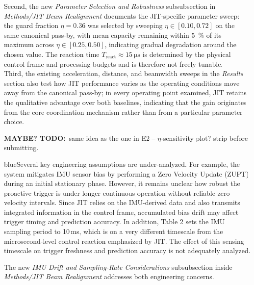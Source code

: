 \documentclass{article}
\newcommand{\blue}[1]{\begin{color}{blue}#1\end{color}}
\newcommand{\todo}[1]{\textcolor{todopurple}{\textbf{MAYBE? TODO:}~#1}}
\begin{document}
\noindent Second, the new \emph{Parameter Selection and Robustness} subsubsection in \emph{Methods/JIT Beam Realignment} documents the JIT-specific parameter sweep: the guard fraction $\eta = 0.36$ was selected by sweeping $\eta \in [0.10, 0.72]$ on the same canonical pass-by, with mean capacity remaining within \SI{5}{\percent} of its maximum across $\eta \in [0.25, 0.50]$, indicating gradual degradation around the chosen value. The reaction time $T_{\text{react}} \approx \SI{15}{\micro\second}$ is determined by the physical control-frame and processing budgets and is therefore not freely tunable.\\

\noindent Third, the existing acceleration, distance, and beamwidth sweeps in the \emph{Results} section also test how JIT performance varies as the operating conditions move away from the canonical pass-by; in every operating point examined, JIT retains the qualitative advantage over both baselines, indicating that the gain originates from the core coordination mechanism rather than from a particular parameter choice.

\todo{same idea as the one in E2 -- $\eta$-sensitivity plot? strip before submitting.}

\begin{tcbremark}
{\selectfont
\blue{Several key engineering assumptions are under-analyzed. For example, the system mitigates IMU sensor bias by performing a Zero Velocity Update (ZUPT) during an initial stationary phase. However, it remains unclear how robust the proactive trigger is under longer continuous operation without reliable zero-velocity intervals. Since JIT relies on the IMU-derived data and also transmits integrated information in the control frame, accumulated bias drift may affect trigger timing and prediction accuracy. In addition, Table 2 sets the IMU sampling period to 10\,ms, which is on a very different timescale from the microsecond-level control reaction emphasized by JIT. The effect of this sensing timescale on trigger freshness and prediction accuracy is not adequately analyzed.}
}
\end{tcbremark}

\noindent The new \emph{IMU Drift and Sampling-Rate Considerations} subsubsection inside \emph{Methods/JIT Beam Realignment} addresses both engineering concerns.\\
\end{document}
